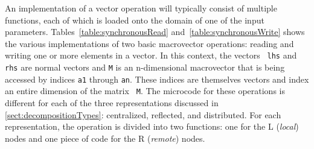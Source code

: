 An implementation of a vector operation will typically consist of multiple
functions, each of which is loaded onto the domain of one of the input
parameters. Tables~\ref{table:synchronousRead} and~\ref{table:synchronousWrite}
shows the various implementations of two basic macrovector operations: reading
and writing one or more elements in a vector. In this context, the vectors {\tt
lhs} and {\tt rhs} are normal vectors and {\tt M} is an n-dimensional
macrovector that is being accessed by indices {\tt a1} through {\tt an}.  These
indices are themselves vectors and index an entire dimension of the matrix {\tt
M}.  The microcode for these operations is different for each of the three
representations discussed in \ref{sect:decompositionTypes}: centralized,
reflected, and distributed.  For each representation, the operation is divided
into two functions: one for the L (\emph{local}) nodes and one piece of code for
the R (\emph{remote}) nodes.

